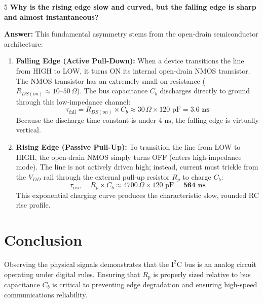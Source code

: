 \documentclass[11pt,a4paper]{article}
\begin{document}
\begin{questionbox}{5}
\textbf{Why is the rising edge slow and curved, but the falling edge is sharp and almost instantaneous?}
\end{questionbox}
\textbf{Answer:} This fundamental asymmetry stems from the open-drain semiconductor architecture:
\begin{enumerate}
    \item \textbf{Falling Edge (Active Pull-Down):} When a device transitions the line from HIGH to LOW, it turns ON its internal open-drain NMOS transistor. The NMOS transistor has an extremely small on-resistance ($R_{DS(on)} \approx 10\text{--}50\,\Omega$). The bus capacitance $C_b$ discharges directly to ground through this low-impedance channel:
    \begin{equation}
    \tau_{\text{fall}} = R_{DS(on)} \times C_b \approx 30\,\Omega \times 120\text{ pF} = \mathbf{3.6\text{ ns}}
    \end{equation}
    Because the discharge time constant is under $4\text{ ns}$, the falling edge is virtually vertical.
    \item \textbf{Rising Edge (Passive Pull-Up):} To transition the line from LOW to HIGH, the open-drain NMOS simply turns OFF (enters high-impedance mode). The line is not actively driven high; instead, current must trickle from the $V_{DD}$ rail through the external pull-up resistor $R_p$ to charge $C_b$:
    \begin{equation}
    \tau_{\text{rise}} = R_p \times C_b \approx 4700\,\Omega \times 120\text{ pF} = \mathbf{564\text{ ns}}
    \end{equation}
    This exponential charging curve produces the characteristic slow, rounded RC rise profile.
\end{enumerate}

\section{Conclusion}
Observing the physical signals demonstrates that the $\text{I}^2\text{C}$ bus is an analog circuit operating under digital rules. Ensuring that $R_p$ is properly sized relative to bus capacitance $C_b$ is critical to preventing edge degradation and ensuring high-speed communications reliability.
\end{document}
